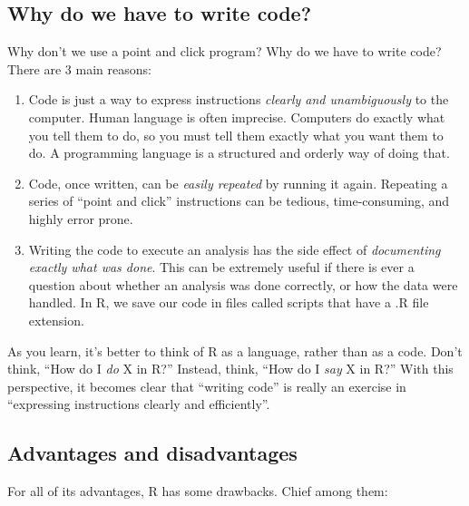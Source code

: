 \documentclass[
  13,
  letterpaper,
]{report}
\begin{document}
\subsection{Why do we have to write code?}\label{sec-02-faq-code}

Why don't we use a point and click program? Why do we have to write
code? There are 3 main reasons:

\begin{enumerate}
\def\labelenumi{\arabic{enumi}.}
\item
  Code is just a way to express instructions \emph{clearly and
  unambiguously} to the computer. Human language is often imprecise.
  Computers do exactly what you tell them to do, so you must tell them
  exactly what you want them to do. A programming language is a
  structured and orderly way of doing that.
\item
  Code, once written, can be \emph{easily repeated} by running it again.
  Repeating a series of ``point and click'' instructions can be tedious,
  time-consuming, and highly error prone.
\item
  Writing the code to execute an analysis has the side effect of
  \emph{documenting exactly what was done}. This can be extremely useful
  if there is ever a question about whether an analysis was done
  correctly, or how the data were handled. In R, we save our code in
  files called scripts that have a .R file extension.
\end{enumerate}

As you learn, it's better to think of R as a language, rather than as a
code. Don't think, ``How do I \emph{do} X in R?'' Instead, think, ``How
do I \emph{say} X in R?'' With this perspective, it becomes clear that
``writing code'' is really an exercise in ``expressing instructions
clearly and efficiently''.

\subsection{Advantages and disadvantages}\label{sec-02-faq-advdis}

For all of its advantages, R has some drawbacks. Chief among them:
\end{document}
